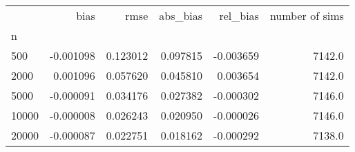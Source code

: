 \begin{tabular}{lrrrrr}
\toprule
{} &      bias &      rmse &  abs_bias &  rel_bias &  number of sims \\
n     &           &           &           &           &                 \\
\midrule
500   & -0.001098 &  0.123012 &  0.097815 & -0.003659 &          7142.0 \\
2000  &  0.001096 &  0.057620 &  0.045810 &  0.003654 &          7142.0 \\
5000  & -0.000091 &  0.034176 &  0.027382 & -0.000302 &          7146.0 \\
10000 & -0.000008 &  0.026243 &  0.020950 & -0.000026 &          7146.0 \\
20000 & -0.000087 &  0.022751 &  0.018162 & -0.000292 &          7138.0 \\
\bottomrule
\end{tabular}
